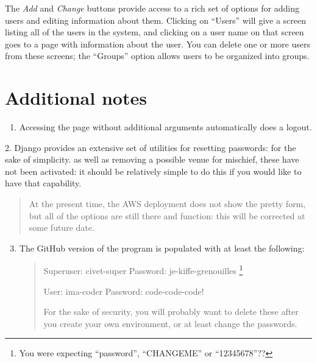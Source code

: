 \documentclass[letterpaper,10pt,english]{sphinxmanual}
\begin{document}
The \emph{Add} and \emph{Change} buttons provide access to a rich set of options for adding users and editing information about them.
Clicking on “Users” will give a screen listing all of the users in the system, and clicking on a user name on that screen
goes to a page with information about the user. You can delete one or more users from these screens; the “Groups” option
allows users to be organized into groups.


\section{Additional notes}
\label{authentication:additional-notes}\begin{enumerate}
\item {} 
Accessing the page without additional arguments automatically does a logout.

\end{enumerate}

2. Django provides an extensive set of utilities for resetting passwords: for the sake of simplicity. as well as removing a
possible venue for mischief, these have not been activated: it should be relatively simple to do this if you would like
to have that capability.
\begin{quote}

At the present time, the AWS deployment does not show the pretty form, but all of the options are still there and
function: this will be corrected at some future date.
\end{quote}
\begin{enumerate}
\setcounter{enumi}{2}
\item {} 
The GitHub version of the program is populated with at least the following:
\begin{quote}

Superuser: civet-super  Password: je-kiffe-grenouilles \footnote{
You were expecting “password”, “CHANGEME” or “12345678”??
}

User: ima-coder  Password: code-code-code!

For the sake of security, you will probably want to delete these after you create your own environment, or at
least change the passwords.
\end{quote}

\end{enumerate}
\end{document}
